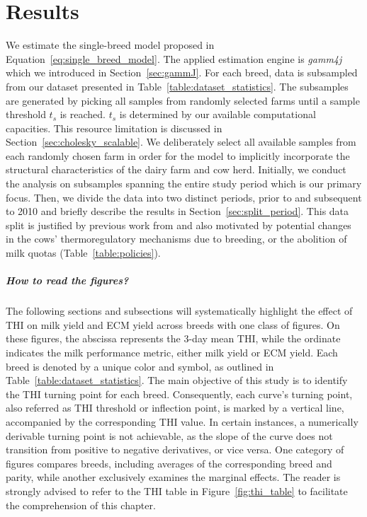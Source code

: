 \chapter{Results}\label{chap:results}
We estimate the single-breed model proposed in Equation~\ref{eq:single_breed_model}. The applied estimation engine is \textit{gamm4j} which we introduced in Section~\ref{sec:gammJ}. For each breed, data is subsampled from our dataset presented in Table~\ref{table:dataset_statistics}. The subsamples are generated by picking all samples from randomly selected farms until a sample threshold $t_s$ is reached. $t_s$ is determined by our available computational capacities. This resource limitation is discussed in Section~\ref{sec:cholesky_scalable}. We deliberately select all available samples from each randomly chosen farm in order for the model to implicitly incorporate the structural characteristics of the dairy farm and cow herd. Initially, we conduct the analysis on subsamples spanning the entire study period which is our primary focus. Then, we divide the data into two distinct periods, prior to and subsequent to 2010 and briefly describe the results in Section~\ref{sec:split_period}. This data split is justified by previous work from \cite{gisbert-queral_climate_2021} and also motivated by potential changes in the cows' thermoregulatory mechanisms due to breeding, or the abolition of milk quotas (Table~\ref{table:policies}).

\paragraph{How to read the figures?} The following sections and subsections will systematically highlight the effect of THI on milk yield and ECM yield across breeds with one class of figures. On these figures, the abscissa represents the 3-day mean THI, while the ordinate indicates the milk performance metric, either milk yield or ECM yield. Each breed is denoted by a unique color and symbol, as outlined in Table~\ref{table:dataset_statistics}. The main objective of this study is to identify the THI turning point for each breed. Consequently, each curve's turning point, also referred as THI threshold or inflection point, is marked by a vertical line, accompanied by the corresponding THI value. In certain instances, a numerically derivable turning point is not achievable, as the slope of the curve does not transition from positive to negative derivatives, or vice versa. One category of figures compares breeds, including averages of the corresponding breed and parity, while another exclusively examines the marginal effects. The reader is strongly advised to refer to the THI table in Figure~\ref{fig:thi_table} to facilitate the comprehension of this chapter.

